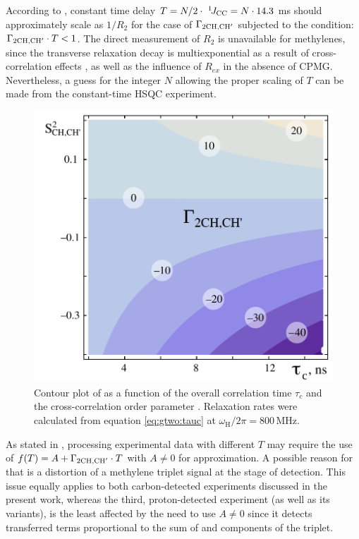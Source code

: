 \documentclass[twocolumn]{svjour3}           %
\begin{document}
According to \cite{carlomagno_errors_2000}, constant time delay 
$T = N/2\cdot~^1\!J_{\text{CC}} = N\cdot 14.3$ ms should approximately scale as 
$1/R_2$ for the case of  $\Gamma_{\text{2CH,CH}'}$ subjected to the condition: 
$\Gamma_{\text{2CH,CH}'}\cdot T < 1$. The direct measurement of $R_2$ is unavailable 
for methylenes, since the \clab{} transverse relaxation decay is 
multiexponential as a result of cross-correlation
effects \cite{yang_probing_2011}, as well as the influence of $R_{ex}$ in the absence of {CPMG}. Nevertheless, a guess for the integer  $N$ allowing the proper scaling of $T$ can be made from the constant-time \clab{} {HSQC} experiment.

\begin{figure}
    \includegraphics[width=\columnwidth]{Fig4_tc}
    \caption{
    Contour plot of 
    \gtwoCH{} as a function of the overall correlation time $ \tau_c $ 
    and the cross-correlation order parameter \StwoCH{}. Relaxation rates 
    were calculated from equation \eqref{eq:gtwo:tauc} at $\omega_\text{H}/2 \pi = 800\,\text{MHz}$.}
    \label{fig:g2contours}
\end{figure}

As stated in \cite{carlomagno_errors_2000}, processing experimental data with different $T$ may require the use of $f(T) = A + \Gamma_{\text{2CH,CH}'}\cdot T$ with $A \ne 0$ for approximation. A possible reason for that is a distortion of a methylene \clab{} triplet signal 
at the stage of detection. This issue equally applies to both
carbon-detected experiments discussed in the present work, whereas the
third, proton-detected experiment (as well as its variants), is the 
least affected by the need to use $A \ne 0$ since it detects 
transferred terms proportional to the sum of \qinner{} and 
\qouter{} components of the triplet. 
\end{document}
